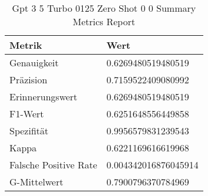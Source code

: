 
    \begin{table}[!ht]
        \centering
        \begin{tabularx}{\textwidth}{X l}
\toprule
\textbf{Metrik} & \textbf{Wert} \\
\midrule
Genauigkeit & \num{0.6269480519480519} \\
Präzision & \num{0.7159522409080992} \\
Erinnerungswert & \num{0.6269480519480519} \\
F1-Wert & \num{0.6251648556449858} \\
Spezifität & \num{0.9956579831239543} \\
Kappa & \num{0.6221169616619968} \\
Falsche Positive Rate & \num{0.004342016876045914} \\
G-Mittelwert & \num{0.7900796370784969} \\
\bottomrule
\end{tabularx}

        \caption{Gpt 3 5 Turbo 0125 Zero Shot 0 0 Summary Metrics Report}
        \label{tab:gpt-3-5-turbo-0125-zero-shot-0-0-summary-metrics-report}
    \end{table}
    